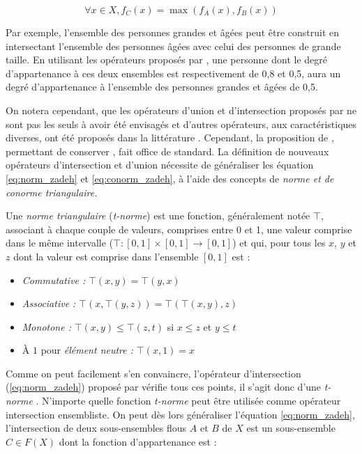 \begin{equation}
  \label{eq:conorm_zadeh}
  ∀x ∈ X, f_C (x) = \max(f_A(x), f_B(x))
\end{equation}

Par exemple, l’ensemble des personnes grandes et âgées peut être
construit en intersectant l’ensemble des personnes âgées avec celui
des personnes de grande taille. En utilisant les opérateurs proposés
par \textcite{Zadeh1965}, une personne dont le degré d’appartenance à
ces deux ensembles est respectivement de 0,8 et 0,5, aura un degré
d’appartenance à l’ensemble des personnes grandes et âgées de 0,5.

On notera cependant, que les opérateurs d’union et d’intersection
proposés par \textcite{Zadeh1965} ne sont pas les seuls à avoir été
envisagés et d’autres opérateurs, aux caractéristiques diverses, ont
été proposés dans la littérature
\autocite{Klir1995,Bouchon-Meunier1995}. Cependant, la proposition de
\textcite{Zadeh1965}, permettant de conserver
, fait office de standard. La
définition de nouveaux opérateurs d'intersection et d'union nécessite
de généraliser les équation \ref{eq:norm_zadeh} et
\ref{eq:conorm_zadeh}, à l'aide des concepts de \emph{norme \emph{et
    de} conorme triangulaire.}

Une \emph{norme triangulaire} (\emph{t-norme}) est une fonction,
généralement notée $\top$, associant à chaque couple de valeurs,
comprises entre 0 et 1, une valeur comprise dans le même intervalle
(\ie $\top : [0,1] × [0,1] \rightarrow [0,1]$) et qui, pour tous les
$x$, $y$ et $z$ dont la valeur est comprise dans l'ensemble $[0,1]$
est :

\begin{itemize}
\item \emph{Commutative :} \(⊤(x,y) = ⊤(y,x)\)
\item \emph{Associative :} \(⊤(x,⊤(y,z)) = ⊤(⊤(x,y),z)\)
\item \emph{Monotone :} \(⊤(x,y) ≤ ⊤(z,t)\) si \(x ≤ z\) et \(y ≤ t\)
\item À \(1\) pour \emph{élément neutre :} \(⊤(x,1) = x\)
\end{itemize}

Comme on peut facilement s'en convaincre, l'opérateur d'intersection
(\autoref{eq:norm_zadeh}) proposé par \textcite{Zadeh1965} vérifie
tous ces points, il s'agit donc d'une \emph{t-norme}
\autocite{Bouchon-Meunier2007}. N'importe quelle fonction
\emph{t-norme} peut être utilisée comme opérateur intersection
ensembliste. On peut dès lors généraliser l'équation
\ref{eq:norm_zadeh}, l'intersection de deux sous-ensembles flous \(A\)
et \(B\) de \(X\) est un sous-ensemble \(C ∈ F(X)\) dont la fonction
d’appartenance est :

